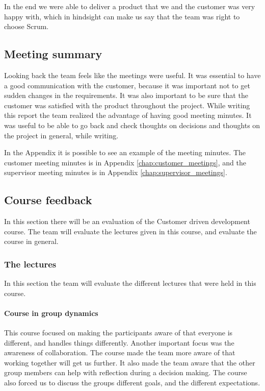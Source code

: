 In the end we were able to deliver a product that we and the customer was very happy with, which in hindsight can make us say that the team was right to choose Scrum.

\subsection{Meeting summary}
Looking back the team feels like the meetings were useful. It was essential to have a good communication with the customer, because it was important not to get sudden changes in the requirements. It was also important to be sure that the customer was satisfied with the product throughout the project. While writing this report the team realized the advantage of having good meeting minutes. It was useful to be able to go back and check thoughts on decisions and thoughts on the project in general, while writing.

In the Appendix it is possible to see an example of the meeting minutes. The customer meeting minutes is in Appendix \ref{chap:customer_meetings}, and the supervisor meeting minutes is in Appendix \ref{chap:supervisor_meetings}. 
\subsection{Course feedback}
In this section there will be an evaluation of the Customer driven development course. The team will evaluate the lectures given in this course, and evaluate the course in general.

\subsubsection{The lectures}
In this section the team will evaluate the different lectures that were held in this course.

\paragraph{Course in group dynamics}
This course focused on making the participants aware of that everyone is different, and handles things differently. Another important focus was the awareness of collaboration. The course made the team more aware of that working together will get us further. It also made the team aware that the other group members can help with reflection during a decision making. The course also forced us to discuss the groups different goals, and the different expectations. 

